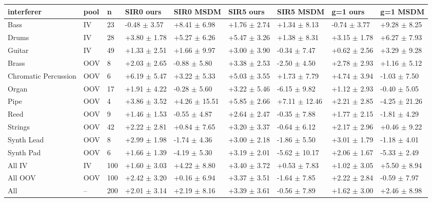\begin{tabular}{lllllllll}
\toprule
interferer & pool & n & SIR0 ours & SIR0 MSDM & SIR5 ours & SIR5 MSDM & g=1 ours & g=1 MSDM\\
\midrule
Bass & IV & 23 & -0.48 $\pm$ 3.57 & +8.41 $\pm$ 6.98 & +1.76 $\pm$ 2.74 & +1.34 $\pm$ 8.13 & -0.74 $\pm$ 3.77 & +9.28 $\pm$ 8.25\\
Drums & IV & 28 & +3.80 $\pm$ 1.78 & +5.27 $\pm$ 6.26 & +5.47 $\pm$ 3.26 & +1.38 $\pm$ 8.31 & +3.15 $\pm$ 1.78 & +6.27 $\pm$ 7.93\\
Guitar & IV & 49 & +1.33 $\pm$ 2.51 & +1.66 $\pm$ 9.97 & +3.00 $\pm$ 3.90 & -0.34 $\pm$ 7.47 & +0.62 $\pm$ 2.56 & +3.29 $\pm$ 9.28\\
Brass & OOV & 8 & +2.03 $\pm$ 2.65 & -0.88 $\pm$ 5.80 & +3.38 $\pm$ 2.53 & -2.50 $\pm$ 4.50 & +2.78 $\pm$ 2.93 & +1.16 $\pm$ 5.12\\
Chromatic Percussion & OOV & 6 & +6.19 $\pm$ 5.47 & +3.22 $\pm$ 5.33 & +5.03 $\pm$ 3.55 & +1.73 $\pm$ 7.79 & +4.74 $\pm$ 3.94 & -1.03 $\pm$ 7.50\\
Organ & OOV & 17 & +1.91 $\pm$ 4.22 & -0.28 $\pm$ 5.60 & +3.22 $\pm$ 5.46 & -6.15 $\pm$ 9.82 & +1.12 $\pm$ 2.93 & -0.40 $\pm$ 5.05\\
Pipe & OOV & 4 & +3.86 $\pm$ 3.52 & +4.26 $\pm$ 15.51 & +5.85 $\pm$ 2.66 & +7.11 $\pm$ 12.46 & +2.21 $\pm$ 2.85 & -4.25 $\pm$ 21.26\\
Reed & OOV & 9 & +1.46 $\pm$ 1.53 & -0.55 $\pm$ 4.87 & +2.64 $\pm$ 2.47 & -0.35 $\pm$ 7.88 & +1.77 $\pm$ 2.15 & -1.81 $\pm$ 4.29\\
Strings & OOV & 42 & +2.22 $\pm$ 2.81 & +0.84 $\pm$ 7.65 & +3.20 $\pm$ 3.37 & -0.64 $\pm$ 6.12 & +2.17 $\pm$ 2.96 & +0.46 $\pm$ 9.22\\
Synth Lead & OOV & 8 & +2.99 $\pm$ 1.98 & -1.74 $\pm$ 4.36 & +3.00 $\pm$ 2.18 & -1.86 $\pm$ 5.50 & +3.01 $\pm$ 1.79 & -1.18 $\pm$ 4.01\\
Synth Pad & OOV & 6 & +1.66 $\pm$ 1.39 & -4.19 $\pm$ 5.30 & +3.19 $\pm$ 2.01 & -5.62 $\pm$ 10.17 & +2.06 $\pm$ 1.67 & -5.33 $\pm$ 2.49\\
All IV & IV & 100 & +1.60 $\pm$ 3.03 & +4.22 $\pm$ 8.80 & +3.40 $\pm$ 3.72 & +0.53 $\pm$ 7.83 & +1.02 $\pm$ 3.05 & +5.50 $\pm$ 8.94\\
All OOV & OOV & 100 & +2.42 $\pm$ 3.20 & +0.16 $\pm$ 6.94 & +3.37 $\pm$ 3.51 & -1.64 $\pm$ 7.85 & +2.22 $\pm$ 2.84 & -0.59 $\pm$ 7.97\\
All & -- & 200 & +2.01 $\pm$ 3.14 & +2.19 $\pm$ 8.16 & +3.39 $\pm$ 3.61 & -0.56 $\pm$ 7.89 & +1.62 $\pm$ 3.00 & +2.46 $\pm$ 8.98\\
\bottomrule
\end{tabular}

